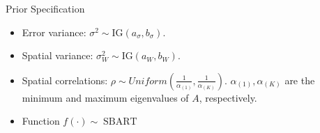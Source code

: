 \documentclass{beamer}
\begin{document}
\begin{frame}{Prior Specification}
  \begin{itemize}
    \item Error variance: \( \sigma^2 \sim \mathrm{IG}(a_\sigma,b_\sigma) \).
    \item Spatial variance: \( \sigma_W^2 \sim \mathrm{IG}(a_W,b_W) \).
    \item Spatial correlations: \(\rho \sim Uniform(\frac{1}{\alpha_{(1)}},\frac{1}{\alpha_{(K)}})\). \(\alpha_{(1)},\alpha_{(K)}\) are the minimum and maximum eigenvalues of \(A\), respectively.
    \item Function \( f(\cdot) \sim \operatorname{SBART}\)
  \end{itemize}
\end{frame}

\end{document}

